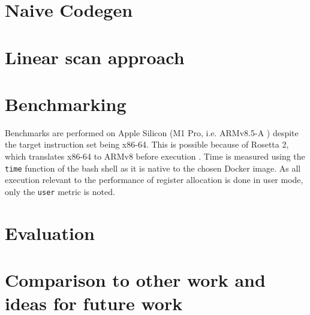 \documentclass{article}
\begin{document}
%
%
%
%
%

\section{Naive Codegen}

%

\section{Linear scan approach}


\section{Benchmarking}
Benchmarks are performed on Apple Silicon (M1 Pro, i.e. ARMv8.5-A \cite{AM1}) despite the target instruction set being x86-64. This is possible because of Rosetta 2, which  translates x86-64 to ARMv8 before execution \cite{A2012}.  Time is measured using the \lstinline!time! function of the bash shell as it is native to the chosen Docker image.  As all execution relevant to the performance of register allocation is done in user mode, only the \lstinline!user! metric is noted.



\section{Evaluation}


%


\section{Comparison to other work and ideas for future work}
\end{document}
